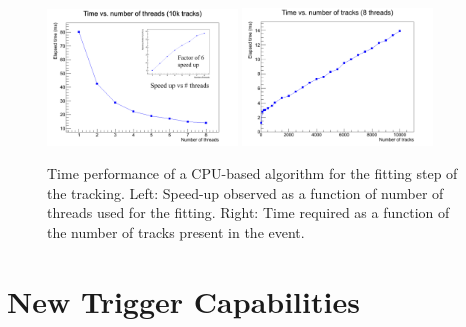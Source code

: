 \documentclass{JINST}
\begin{document}
\begin{figure}[!Hhtb]
\begin{center}
	\includegraphics[width=0.45\textwidth]{figs/TimeVsThreads.pdf}
	\includegraphics[width=0.45\textwidth]{figs/TimeVsTracks.pdf}
	\caption{Time performance of a CPU-based algorithm for the fitting step of the tracking. Left: Speed-up observed
	as a function of number of threads used for the fitting. Right: Time required as a function of the number of
	tracks present in the event. \label{fig:FittingTime}}
\end{center}
\end{figure}

\section{New Trigger Capabilities}
\end{document}
